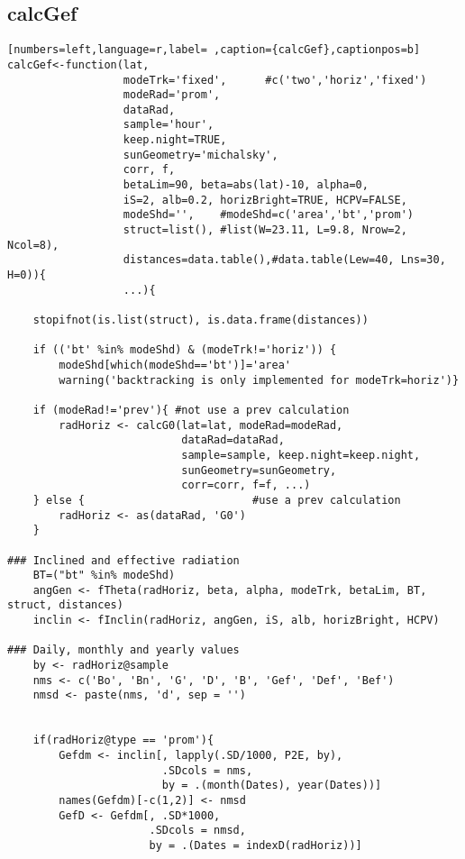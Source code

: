 \subsection{calcGef}
\label{sec:orgea7e15e}
\label{subsec:calcgef}
\begin{lstlisting}[numbers=left,language=r,label= ,caption={calcGef},captionpos=b]
calcGef<-function(lat,
                  modeTrk='fixed',      #c('two','horiz','fixed')
                  modeRad='prom', 
                  dataRad,
                  sample='hour',
                  keep.night=TRUE,
                  sunGeometry='michalsky',
                  corr, f,
                  betaLim=90, beta=abs(lat)-10, alpha=0,
                  iS=2, alb=0.2, horizBright=TRUE, HCPV=FALSE,
                  modeShd='',    #modeShd=c('area','bt','prom')
                  struct=list(), #list(W=23.11, L=9.8, Nrow=2, Ncol=8), 
                  distances=data.table(),#data.table(Lew=40, Lns=30, H=0)){
                  ...){

    stopifnot(is.list(struct), is.data.frame(distances))

    if (('bt' %in% modeShd) & (modeTrk!='horiz')) {
        modeShd[which(modeShd=='bt')]='area'
        warning('backtracking is only implemented for modeTrk=horiz')}

    if (modeRad!='prev'){ #not use a prev calculation
        radHoriz <- calcG0(lat=lat, modeRad=modeRad,
                           dataRad=dataRad,
                           sample=sample, keep.night=keep.night,
                           sunGeometry=sunGeometry,
                           corr=corr, f=f, ...)
    } else {                          #use a prev calculation
        radHoriz <- as(dataRad, 'G0') 
    } 

### Inclined and effective radiation
    BT=("bt" %in% modeShd) 
    angGen <- fTheta(radHoriz, beta, alpha, modeTrk, betaLim, BT, struct, distances)
    inclin <- fInclin(radHoriz, angGen, iS, alb, horizBright, HCPV)

### Daily, monthly and yearly values
    by <- radHoriz@sample
    nms <- c('Bo', 'Bn', 'G', 'D', 'B', 'Gef', 'Def', 'Bef')
    nmsd <- paste(nms, 'd', sep = '')


    if(radHoriz@type == 'prom'){
        Gefdm <- inclin[, lapply(.SD/1000, P2E, by),
                        .SDcols = nms,
                        by = .(month(Dates), year(Dates))]
        names(Gefdm)[-c(1,2)] <- nmsd
        GefD <- Gefdm[, .SD*1000,
                      .SDcols = nmsd,
                      by = .(Dates = indexD(radHoriz))]


\end{lstlisting}
